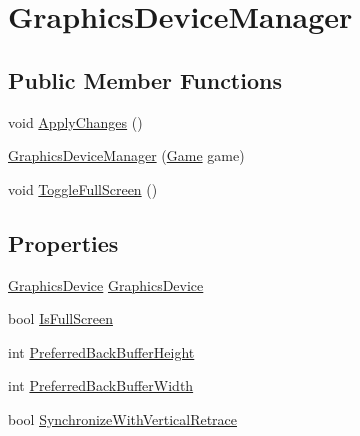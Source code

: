 \hypertarget{classMicrosoft_1_1Xna_1_1Framework_1_1GraphicsDeviceManager}{}\section{Graphics\+Device\+Manager}
\label{classMicrosoft_1_1Xna_1_1Framework_1_1GraphicsDeviceManager}
\subsection*{Public Member Functions}
\begin{DoxyCompactItemize}
\item 
void \hyperlink{classMicrosoft_1_1Xna_1_1Framework_1_1GraphicsDeviceManager_a27a4bd5c1d94aae3d4991b3bff39327c}{Apply\+Changes} ()
\item 
\hyperlink{classMicrosoft_1_1Xna_1_1Framework_1_1GraphicsDeviceManager_a4c1f7496b8c72217c81f56d6c604d2dc}{Graphics\+Device\+Manager} (\hyperlink{classMicrosoft_1_1Xna_1_1Framework_1_1Game}{Game} game)
\item 
void \hyperlink{classMicrosoft_1_1Xna_1_1Framework_1_1GraphicsDeviceManager_a2710fa7553d1f1bac82900ca7a7a02e1}{Toggle\+Full\+Screen} ()
\end{DoxyCompactItemize}
\subsection*{Properties}
\begin{DoxyCompactItemize}
\item 
\hyperlink{classMicrosoft_1_1Xna_1_1Framework_1_1Graphics_1_1GraphicsDevice}{Graphics\+Device} \hyperlink{classMicrosoft_1_1Xna_1_1Framework_1_1GraphicsDeviceManager_a0effcfeca0faa77862cd406f75026efa}{Graphics\+Device}
\item 
bool \hyperlink{classMicrosoft_1_1Xna_1_1Framework_1_1GraphicsDeviceManager_a8a1e0ab8b1544f4b0e154ea50d82c17e}{Is\+Full\+Screen}
\item 
int \hyperlink{classMicrosoft_1_1Xna_1_1Framework_1_1GraphicsDeviceManager_ab2361996aef1f1586a9572fa12cf9ef8}{Preferred\+Back\+Buffer\+Height}
\item 
int \hyperlink{classMicrosoft_1_1Xna_1_1Framework_1_1GraphicsDeviceManager_ad6b8ecd1a6894c9990c9f1672205f34a}{Preferred\+Back\+Buffer\+Width}
\item 
bool \hyperlink{classMicrosoft_1_1Xna_1_1Framework_1_1GraphicsDeviceManager_a6a404f73959443025ea78bf193ec7d45}{Synchronize\+With\+Vertical\+Retrace}
\end{DoxyCompactItemize}


